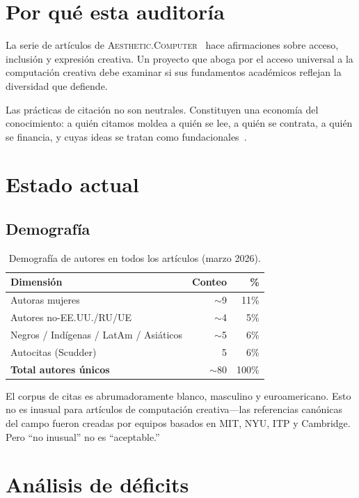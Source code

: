 \documentclass[10pt,letterpaper,twocolumn]{article}
\newcommand{\ac}{\textsc{Aesthetic.Computer}}
\begin{document}
\section{Por qué esta auditoría}

La serie de artículos de \ac{}~\citep{scudder2026ac, scudder2026kidlisp, scudder2026acos, scudder2026pieces, scudder2026notepat} hace afirmaciones sobre acceso, inclusión y expresión creativa. Un proyecto que aboga por el acceso universal a la computación creativa debe examinar si sus fundamentos académicos reflejan la diversidad que defiende.

Las prácticas de citación no son neutrales. Constituyen una economía del conocimiento: a quién citamos moldea a quién se lee, a quién se contrata, a quién se financia, y cuyas ideas se tratan como fundacionales~\citep{benjamin2019race}.

\section{Estado actual}

\subsection{Demografía}

\begin{table}[h]
\small
\centering
\begin{tabular}{lrr}
\toprule
\textbf{Dimensión} & \textbf{Conteo} & \textbf{\%} \\
\midrule
Autoras mujeres & $\sim$9 & 11\% \\
Autores no-EE.UU./RU/UE & $\sim$4 & 5\% \\
Negros / Indígenas / LatAm / Asiáticos & $\sim$5 & 6\% \\
Autocitas (Scudder) & 5 & 6\% \\
\midrule
\textbf{Total autores únicos} & $\sim$80 & 100\% \\
\bottomrule
\end{tabular}
\caption{Demografía de autores en todos los artículos (marzo 2026).}
\label{tab:demographics}
\end{table}

El corpus de citas es abrumadoramente blanco, masculino y euroamericano. Esto no es inusual para artículos de computación creativa---las referencias canónicas del campo fueron creadas por equipos basados en MIT, NYU, ITP y Cambridge. Pero ``no inusual'' no es ``aceptable.''

\section{Análisis de déficits}
\end{document}

